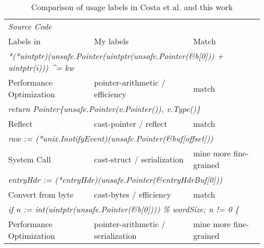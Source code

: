 \begin{table}[h]
    \centering
    \caption{Comparison of \unsafe{} usage labels in Costa et al. and this work}
    \label{tbl:costa-labels-comparison}
    \begin{tabularx}{\textwidth}{X|l|l}
        \toprule
        \multicolumn{3}{l}{\footnotesize\textit{Source Code}} \\
        Labels in~\cite{costa2020} & My labels                           & Match \\
        \midrule
        \multicolumn{3}{l}{\footnotesize\textit{*(*uintptr)(unsafe.Pointer(uintptr(unsafe.Pointer(\&b[0])) + uintptr(i))) \^{}= kw}} \\
        Performance Optimization   & pointer-arithmetic / efficiency     & match  \\ \hline
        \multicolumn{3}{l}{\footnotesize\textit{return Pointer\{unsafe.Pointer(v.Pointer()), v.Type()\}}} \\
        Reflect                    & cast-pointer / reflect              & match  \\ \hline
        \multicolumn{3}{l}{\footnotesize\textit{raw := (*unix.InotifyEvent)(unsafe.Pointer(\&buf[offset]))}} \\
        System Call                & cast-struct / serialization         & mine more fine-grained \\ \hline
        \multicolumn{3}{l}{\footnotesize\textit{entryHdr := (*entryHdr)(unsafe.Pointer(\&entryHdrBuf[0]))}} \\
        Convert from byte          & cast-bytes / efficiency             & match  \\ \hline
        \multicolumn{3}{l}{\footnotesize\textit{if n := int(uintptr(unsafe.Pointer(\&b[0]))) \% wordSize; n != 0 \{}} \\
        Performance Optimization   & pointer-arithmetic / serialization  & mine more fine-grained \\
        \bottomrule
    \end{tabularx}
\end{table}